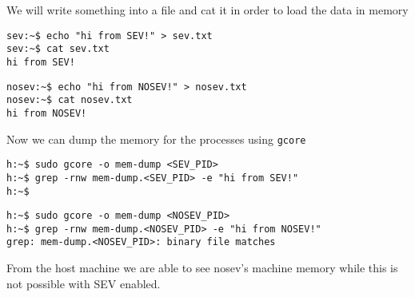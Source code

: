 \documentclass[twocolumn]{article}
\begin{document}
We will write something into a file and cat it in order to load the data in memory

\begin{verbatim}
sev:~$ echo "hi from SEV!" > sev.txt
sev:~$ cat sev.txt
hi from SEV!
\end{verbatim}

\begin{verbatim}
nosev:~$ echo "hi from NOSEV!" > nosev.txt
nosev:~$ cat nosev.txt
hi from NOSEV!
\end{verbatim}

Now we can dump the memory for the processes using \texttt{gcore}

\begin{verbatim}
h:~$ sudo gcore -o mem-dump <SEV_PID>
h:~$ grep -rnw mem-dump.<SEV_PID> -e "hi from SEV!"
h:~$
\end{verbatim}

\begin{verbatim}
h:~$ sudo gcore -o mem-dump <NOSEV_PID>
h:~$ grep -rnw mem-dump.<NOSEV_PID> -e "hi from NOSEV!"
grep: mem-dump.<NOSEV_PID>: binary file matches
\end{verbatim}

From the host machine we are able to see nosev's machine memory while this is not possible with SEV enabled.
\end{document}

